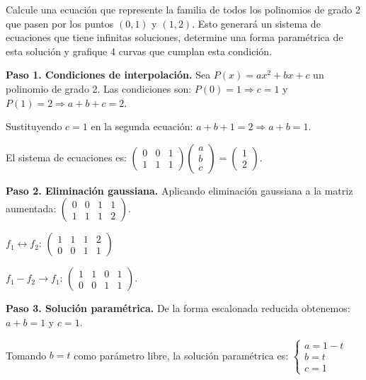 \begin{prob}\label{problemapolinomios}
Calcule una ecuación que represente la familia de todos los polinomios de grado 2 que pasen por los puntos $(0,1)$ y $(1,2).$ Esto generará un sistema de ecuaciones que tiene infinitas soluciones, determine una forma paramétrica de esta solución y grafique 4 curvas que cumplan esta condición.

\begin{myproof}
\textbf{Paso 1. Condiciones de interpolación.} Sea $P(x) = ax^2 + bx + c$ un polinomio de grado 2. Las condiciones son: $P(0) = 1 \Rightarrow c = 1$ y $P(1) = 2 \Rightarrow a + b + c = 2.$

Sustituyendo $c = 1$ en la segunda ecuación: $a + b + 1 = 2 \Rightarrow a + b = 1.$

El sistema de ecuaciones es: $\begin{pmatrix}
0 & 0 & 1 \\
1 & 1 & 1
\end{pmatrix}
\begin{pmatrix}
a \\ b \\ c
\end{pmatrix} = 
\begin{pmatrix}
1 \\ 2
\end{pmatrix}.$

\textbf{Paso 2. Eliminación gaussiana.} Aplicando eliminación gaussiana a la matriz aumentada: $\left(\begin{array}{ccc|c}
0 & 0 & 1 & 1 \\
1 & 1 & 1 & 2
\end{array}\right).$

$f_1 \leftrightarrow f_2$: $\left(\begin{array}{ccc|c}
1 & 1 & 1 & 2 \\
0 & 0 & 1 & 1
\end{array}\right)$

$f_1 - f_2 \rightarrow f_1$: $\left(\begin{array}{ccc|c}
1 & 1 & 0 & 1 \\
0 & 0 & 1 & 1
\end{array}\right).$

\textbf{Paso 3. Solución paramétrica.} De la forma escalonada reducida obtenemos: $a + b = 1$ y $c = 1.$

Tomando $b = t$ como parámetro libre, la solución paramétrica es: $\begin{cases}
a = 1 - t \\
b = t \\
c = 1
\end{cases}$


\end{myproof}
\end{prob}
